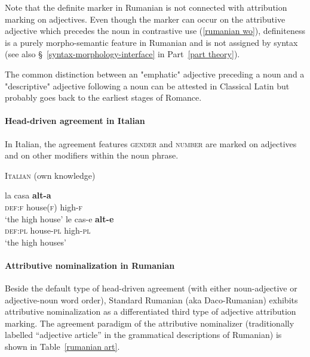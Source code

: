 Note that the definite marker in Rumanian is not connected with attribution marking on adjectives. Even though the marker can occur on the attributive adjective which precedes the noun in contrastive use (\ref{rumanian wo}), definiteness is a purely morpho-semantic feature in Rumanian and is not assigned by syntax (see also \S~\ref{syntax-morphology-interface} in Part~\ref{part theory}).

The common distinction between an "emphatic" adjective preceding a noun and a "descriptive" adjective following a noun can be attested in Classical Latin \cite[146]{posner1996} but probably goes back to the earliest stages of Romance.

\paragraph{Head-driven agreement in Italian} 
In Italian, the agreement features \textsc{gender} and \textsc{number} are marked on adjectives and on other modifiers within the noun phrase.
\begin{exe}
\ex \textsc{Italian} (own knowledge)
\begin{xlist}
\ex
\gll	la casa \textbf{alt-a}\\
	\textsc{def:f} house(\textsc{f}) high-\textsc{f}\\
\glt	‘the high house’
\ex
\gll	le cas-e \textbf{alt-e}\\
	\textsc{def:pl} house-\textsc{pl} high-\textsc{pl}\\
\glt	‘the high houses’
\end{xlist}
\end{exe}

\paragraph{Attributive nominalization in Rumanian}\label{rumanian synchr}
Beside the default type of head-driven agreement (with either noun-adjective or adjective-noun word order), Standard Rumanian (aka Daco-Rumanian) exhibits attributive nominalization as a differentiated third type of adjective attribution marking. The agreement paradigm of the attributive nominalizer (traditionally labelled “adjective article” in the grammatical descriptions of Rumanian) is shown in Table~\ref{rumanian art}.

